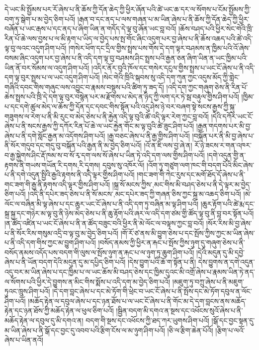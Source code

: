 དེ་ཡང་མི་སྤྱོམས་པར་རོ་ཞེས་པ་ནི་ཆོས་ཀྱི་དོན་ཆེད་ཀྱི་ཕྱིར་ཞོན་པའི་ཚེ་ཡང་ཆ་དར་ལ་སོགས་པ་ངོམ་སྤྱོམས་ཀྱི་བག་ཏུ་སྒེག་པ་མ་བྱེད་ཅིག་པའོ། །རྒན་བ་དང་ནད་པ་ལས་གཞན་པ་མ་ཡིན་ཞེས་པ་ནི་ཆོས་ཀྱི་དོན་ཆེད་ཀྱི་ཕྱིར་བཞོན་པ་ཡང་རྒས་པ་དང་ནད་པ་ཞིག་ཡིན་ན་གདོད་དེ་ལྟ་བུ་ཞོན་ཡང་བླ་བའོ། །ཆོས་བཤད་པའི་ཕྱིར་སེང་གེའི་ཁྲི་རིན་པོ་ཆེ་ལས་བྱས་པ་ལ་མི་རྟག་པ་ཡིད་ལ་བྱེད་པས་སྤ་གོང་ཞིང་འདུག་པར་བྱ་ཞེས་པ་ནི་ཆོས་འཆད་པའི་ཚེ་འདི་ལྟ་བུ་ལའང་འདུག་ཤིག་པའོ། །གསེར་ཕོག་དང་དྲིལ་གྱིས་སྤྲས་པས་གོས་དེ་དག་ལྟར་བཤམས་ན་ཁྱིམ་པའི་འོ་ཞེས་བསམ་ཞིང་འདུག་པར་བྱ་ཞེས་པ་ནི་འདི་དག་ལྟ་བུ་བཤམས་ཤིང་སྤྲས་པའི་རྒྱན་ཅན་ཞིག་ཡིན་ན་ཡང་ཁྱིམ་པའི་ཡིན་ནོ་བར་སོམས་ལ་འདུག་ཤིག་པའོ། །འདིར་ནོར་བུའི་ཁོལ་དང་གསེར་དངུལ་གྱིས་སྤྲས་པ་ཡང་ངོ་ཞེས་པ་ནི་འདི་དག་ལྟ་བུར་སྤྲས་པ་ལ་ཡང་འདུག་ཤིག་པའོ། །སེང་གེའི་ཁྲིའི་སྐབས་སུ་འདི་དག་ཀུན་ཀྱང་འདུས་མོད་ཀྱི་གླེང་གཞིའི་དབང་གིས་གཞུང་ལས་འབྱུང་བ་རྣམས་བསྡུས་པའི་ཚིག་ཏུ་ཟད་དོ། །འདི་དག་ཀྱང་གཞུག་ཅེས་ནི་རིན་པོ་ཆེས་སྤྲས་པའི་ཁྲི་དེ་དག་ལྟ་བུར་བསྙེན་པར་མ་རྫོགས་པ་མེད་ན་ཉིད་ཀྱི་ལག་དར་ཏེ་སྦ་བརྟུལ་གྱིས་ཤིག་པའོ། །ཁྱིམ་པ་དང་དགེ་ཚུལ་མེད་ལ་ཆོས་ཀྱི་དོན་དང་དབང་གིས་སྟོན་པའི་འདུ་ཤེས་ཉེ་བར་བཞག་སྟེ་སངས་རྒྱས་ཀྱི་སྐུ་གཟུགས་ལ་རེག་པ་ནི་མི་རུང་བ་མེད་ཅེས་པ་ནི་རྐྱེན་འདི་ལྟ་བུའི་ཚེ་འདི་ལྟར་རེག་ཀྱང་བླ་བའོ། །དེའི་དཀོར་ཡང་ངོ་ཞེས་པ་ནི་སངས་རྒྱས་ཀྱི་དཀོར་རིན་པོ་ཆེ་ལ་ཡང་རྐྱེན་གོང་མ་ལྟ་བུའི་ཚེ་ཟུང་ཤིག་པའོ། །རྒྱན་གདགས་པར་མི་བྱ་ཞེས་པ་ནི་དགེ་སློང་རྒྱན་མ་འདོགས་ཤིག་པའོ། །རྒྱ་བཅང་ཞེས་པ་ནི་རྒྱ་གྱིས་ཤིག་པའོ། །བསྐོན་པར་ནི་མི་བྱ་ཞེས་པ་ནི་སོར་གདུབ་དང་གདུ་བུ་བསྐོན་པའི་རྒྱན་ནི་མ་བྱེད་ཅིག་པའོ། །འོ་ན་ཇི་ལས་བྱ་ཞེ་ན། རོ་ཉེ་ཟངས་ར་གན་འཁར་བ་རྒྱ་སྐྱེགས་ཤིང་རྡོ་ཁམ་ས་བ་སོ་རྭ་དག་ལས་སོ་ཞེས་པ་ཡིན་ཏེ་འདི་དག་ལས་གྱིས་ཤིག་པའོ། །དགེ་འདུན་གྱི་ན་རྟགས་ནི་གཡས་གཡོན་{རི་དགས,རི་དྭགས}། དབུས་སུ་འཁོར་ལོ། །འོག་ཏུ་གཙུག་ལག་ཁང་གི་བདག་པོའི་མིང་ཞེས་པ་ནི་དགེ་འདུན་སྤྱིའི་རྒྱའི་རྟགས་ནི་འདི་ལྟར་གྱིས་ཤིག་པའོ། །གང་ཟག་གི་ཀེང་རུས་དང་མགོ་ཐོད་དོ་ཞེས་པ་ནི་གང་ཟག་གི་རྒྱ་ནི་རྟགས་འདི་ལྟར་གྱིས་ཤིག་པའོ། །སྐྲ་སོ་{མངས་ཀྱིས་,མང་གིས་}མི་བཤད་ཅེས་པ་ནི་དེ་ལྟར་མ་བྱེད་ཅིག་པའོ། །འདི་ནི་དཔེར་ཟད་ཅེས་པ་ནི་སོ་{མངས་,མང་}དཔེར་ཟད་ཀྱི་གཞན་ཅིས་ཀྱང་སྐྲ་མ་འཆད་ཅིག་པའོ། །མེ་ལོང་ལ་བཞིན་མི་ལྟ་ཞེས་པ་དང་ཆུར་ཡང་ངོ་ཞེས་པ་ནི་འདི་དག་ཏུ་བཞིན་མ་ལྟ་ཤིག་པའོ། །ཆུར་རྟོག་པའི་ཚེ་རྨ་དང་སྐྲ་སྐྱ་དང་གཉེར་མ་ལྟ་བུ་ནི་ཉེས་མེད་ཅེས་པ་ནི་ཆུ་རྟོག་པའི་ཞར་ལ་འདི་དག་ཙམ་གྱི་ཚོད་ལྟ་བུ་ནི་བླ་བར་སྟོན་པའོ། །ན་ཚོད་འཛིན་པ་ཡང་ངོ་ཞེས་པ་ནི་ན་ཚོད་བཟུང་བའི་ཕྱིར་ནི་མེ་ལོང་ལ་བལྟས་ཀྱང་བླ་བའོ། །སོར་རིས་མི་བྱ་ཞེས་པ་ནི་སོར་རིས་གསུམ་འདྲི་བ་ལྟ་བུ་མ་བྱེད་ཅིག་པའོ། །གོ་རོ་ཙ་ནས་མི་བྱུག་ཅེས་པ་དང་སྤོས་ཀྱིས་ཀྱང་མ་ཡིན་ཞེས་པ་ནི་འདི་དག་གིས་ཀྱང་མ་བྱུག་ཤིག་པའོ། །བསོད་ནམས་ཀྱི་ཕྱིར་ན་རྐང་པ་སྤོས་ཀྱིས་ཉུག་དུ་གཞུག་ཅེས་པ་ནི་བསོད་ནམས་འདོད་པས་བདག་གི་ལུས་ལ་སྤོས་ཉུག་ན་རྐང་པ་ལ་ཉུག་ཏུ་ཆུག་ཤིག་པའོ། །དེའི་མདུན་དུ་མི་དབྱེ་ཞེས་པ་ནི་ཡོན་བདག་དེའི་མདུན་དུ་མ་དཔྱིད་ཅིག་པའོ། །དེས་བྱུག་པའི་ཆོ་ག་སྟོན་པ་ནི། དེས་བྱུགས་ན་དགེ་འདུན་འདུ་བར་མ་ཡིན་ཞེས་པ་དང་ཁྱིམ་པ་ལ་ཡང་ཆོས་མི་བཤད་ཅེས་དང་ཁྱིམ་དུའང་མི་འགྲོ་ཞེས་པ་རྣམས་ཡིན་ཏེ་ནད་ལ་སོགས་པའི་ཕྱིར་དེ་བྱུགས་ན་མིང་གིས་སྨོས་པ་འདི་དག་མ་བྱེད་ཅིག་པའོ། །མཇུག་ཏུ་བཀྲུ་ཞེས་པ་ནི་མཇུག་ཏུའང་ཁྲུས་ཤིག་པའོ། །དེ་དག་བླང་ཞེས་པ་དང་མེ་ཏོག་གི་ཕྲེང་བ་ཡང་ངོ་ཞེས་པ་ནི་སྤོས་དང་མེ་ཏོག་དབུལ་ན་ལོང་ཤིག་པའོ། །མཆོད་རྟེན་ལ་དབུལ་ཞེས་པ་དང་ཉན་ཐོས་པ་ལ་ཡང་ངོ་ཞེས་པ་ནི་གོང་མ་དེ་དག་བླངས་ནས་མཆོད་རྟེན་དང་ཉན་ཐོས་ཀྱི་མཆོད་རྟེན་ལ་ཕུལ་ཅིག་པའོ། །སྦྱིན་བདག་མི་དགའ་ན་སྔས་དང་འཕོངས་སུའོ་ཞེས་པ་ནི་མཆོད་རྟེན་ལ་དབུལ་དུ་མི་དགའ་ན། བདག་གི་སྔས་དང་འཕོངས་ཀྱི་ཐད་ཀར་ཡུགས་ཤིག་པའོ། །སྒོ་དང་བྱང་སྟན་དུ་མ་ཡིན་ཞེས་པ་ནི་སྒོ་དང་བྱང་དུ་འབབ་པའི་རྩིག་ངོས་ལ་མ་ཉུག་ཤིག་པའོ། །ཅི་ལ་རྩིག་ཆེན་པོའོ། །རྩིག་པ་ལའོ་ཞེས་པ་ཡིན་ནའོ། 